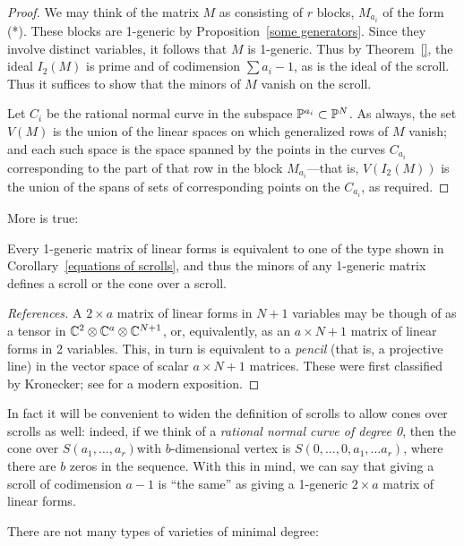 \begin{proof} We may think of the matrix $M$ as consisting of $r$ blocks, $M_{a_{i}}$ of the form (*). These blocks are 1-generic by Proposition~\ref{some generators}. Since they involve distinct variables, it follows that $M$ is 1-generic. Thus by
Theorem~\ref{}, the ideal $I_{2}(M)$ is prime and of codimension $\sum a_{i}-1$, as is the ideal of the scroll. Thus it suffices to show that the minors of $M$ vanish on the scroll.

Let $C_{i}$ be the rational normal curve in the subspace $\PP^{a_{i}}\subset\PP^{N}$.
As always, the set $V(M)$ is the union of the linear spaces on which generalized rows of $M$ vanish; and each such space is the space spanned by the points in the curves $C_{a_{i}}$ corresponding to the part of that row in the block $M_{a_{i}}$---that is, $V(I_{2}(M))$ is the union of the spans of sets of corresponding points on the $C_{a_{i}}$, as required.
\end{proof}

More is true: 
\begin{fact}
 Every
 1-generic matrix of linear forms is equivalent to one of the type shown in
Corollary~\ref{equations of scrolls}, and thus the minors of any 1-generic matrix defines a scroll or the cone over a scroll.
\end{fact}

\begin{proof}[References]
A $2\times a$ matrix of linear forms in $N+1$ variables may be though of as a tensor
in $\CC^{2}\otimes \CC^{a}\otimes \CC^{N+1}$, or, equivalently, as an $a\times N+1$ matrix of linear forms in 2 variables. This, in turn is equivalent to a \emph{pencil} (that is, a projective line) in the vector space of scalar $a\times N+1$ matrices. These were first classified by Kronecker; see 
\cite[Theorems *** and ***]{Gantmacher} for a modern exposition. 
\end{proof}

In fact it will be convenient to widen the definition of scrolls to allow cones over scrolls as well: indeed, if we think of a \emph{rational normal curve of degree 0}, then the cone over $S(a_{1}, \dots, a_{r})$with $b$-dimensional  vertex is $S(0,\dots,0, a_{1}, \dots a_{r})$, where there are 
$b$ zeros in the sequence. With this in mind, we can say that giving a scroll of codimension $a-1$ is ``the same'' as giving a 1-generic $2\times a$ matrix of linear forms.

There are not many types of varieties of minimal degree:

